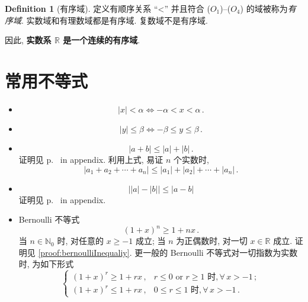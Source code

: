 \documentclass{book}
\newcommand{\bideduce}{\Longleftrightarrow}
\newcommand{\Any}{\forall\,}
\newcommand{\abs}[1]{\left\lvert #1 \right\rvert}
\newcommand{\R}{\mathbb{R}}
\newcommand{\N}{\mathbb{N}}
\numberwithin{equation}{section}
\numberwithin{figure}{section}
\theoremstyle{definition}
\newtheorem{definition}{Definition}
\newcommand{\dq}[1]{``#1''}
\begin{document}
\begin{definition}[有序域]
  定义有顺序关系 \dq{<} 并且符合 ($O_1$)--($O_4$) 的域被称为\emph{有序域}. 实数域和有理数域都是有序域. 复数域不是有序域.
\end{definition}

因此, \textbf{实数系 $\R$ 是一个连续的有序域}.

\section{常用不等式}
\begin{itemize}
  \item 
    \begin{equation}
  \abs{x}<\alpha\bideduce -\alpha<x<\alpha\,.
    \end{equation}
  \item 
    \begin{equation}
      \abs{y}\leqslant \beta\bideduce -\beta\leqslant y\leqslant \beta\,.
    \end{equation}
  \item  
    \begin{equation}\label{eqn:absoluteValueInequality}
      \abs{a+b}\leqslant\abs{a}+\abs{b}\,.
    \end{equation}
    证明见 p.~\pageref{proof:absoluteValueInequality} in appendix.
    利用上式, 易证 $n$ 个实数时,
    \begin{equation}
      \abs{a_1+a_2+\cdots+a_n}\leqslant\abs{a_1}+\abs{a_2}+\cdots+\abs{a_n}\,.
    \end{equation}
  \item 
    \begin{equation}\label{eqn:stangeAbsoluteValueInequality}
      \big\lvert\lvert a \rvert-\lvert b\rvert\big\rvert\leqslant\abs{a-b}
    \end{equation}
    证明见 p.~\pageref{proof:StrangeAbsoluteValueInequality} in appendix.
  \item Bernoulli 不等式
    \begin{equation}
(1+x)^n\geqslant 1+nx\,.
      \label{eqn:bernoulliInequality}
    \end{equation}
    当 $n\in\N_0$ 时, 对任意的 $x\geqslant-1$ 成立; 当 $n$ 为正偶数时, 对一切 $x\in\R$ 成立. 证明见 \cref{proof:bernoulliInequaliy}. 更一般的 Bernoulli 不等式对一切指数为实数时, 为如下形式
    \begin{equation}
      \begin{cases}
	(1+x)^r\geqslant 1+rx\,,&r\leqslant 0\text{ or }r\geqslant 1\text{ 时},\Any x>-1\,;\\
	(1+x)^r\leqslant 1+rx\,,&0\leqslant r\leqslant 1\text{ 时},\Any x>-1\,.
      \end{cases}
      \label{eqn:GeneralizedBernoulliInequality}
    \end{equation}
\end{itemize}
\end{document}
